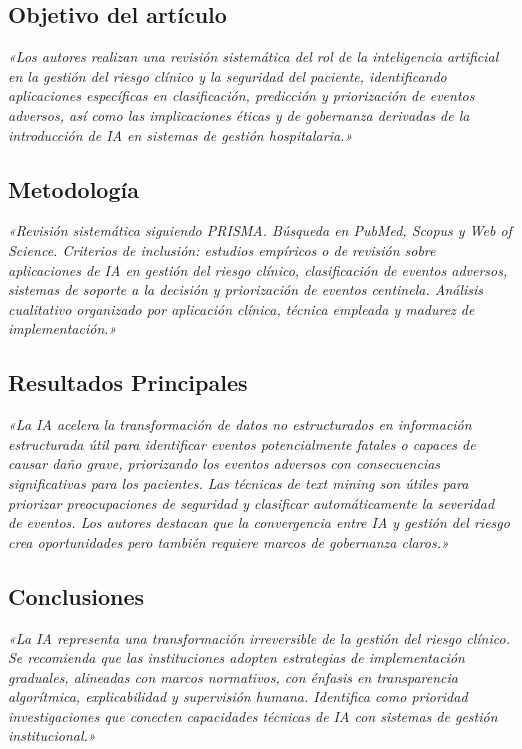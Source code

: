 \documentclass[11pt,a4paper]{article}
\newcommand{\cita}[1]{{\color{navy}\textit{«#1»}}}
\begin{document}
\subsection{Objetivo del artículo}
\cita{Los autores realizan una revisión sistemática del rol de la inteligencia artificial en la gestión del riesgo clínico y la seguridad del paciente, identificando aplicaciones específicas en clasificación, predicción y priorización de eventos adversos, así como las implicaciones éticas y de gobernanza derivadas de la introducción de IA en sistemas de gestión hospitalaria.}

\subsection{Metodología}
\cita{Revisión sistemática siguiendo PRISMA. Búsqueda en PubMed, Scopus y Web of Science. Criterios de inclusión: estudios empíricos o de revisión sobre aplicaciones de IA en gestión del riesgo clínico, clasificación de eventos adversos, sistemas de soporte a la decisión y priorización de eventos centinela. Análisis cualitativo organizado por aplicación clínica, técnica empleada y madurez de implementación.}

\subsection{Resultados Principales}
\cita{La IA acelera la transformación de datos no estructurados en información estructurada útil para identificar eventos potencialmente fatales o capaces de causar daño grave, priorizando los eventos adversos con consecuencias significativas para los pacientes. Las técnicas de text mining son útiles para priorizar preocupaciones de seguridad y clasificar automáticamente la severidad de eventos. Los autores destacan que la convergencia entre IA y gestión del riesgo crea oportunidades pero también requiere marcos de gobernanza claros.}

\subsection{Conclusiones}
\cita{La IA representa una transformación irreversible de la gestión del riesgo clínico. Se recomienda que las instituciones adopten estrategias de implementación graduales, alineadas con marcos normativos, con énfasis en transparencia algorítmica, explicabilidad y supervisión humana. Identifica como prioridad investigaciones que conecten capacidades técnicas de IA con sistemas de gestión institucional.}
\end{document}
